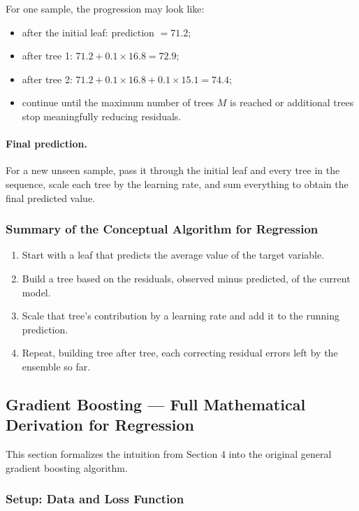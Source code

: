 \documentclass[12pt,openany]{book}
\begin{document}
For one sample, the progression may look like:
\begin{itemize}[leftmargin=*]
    \item after the initial leaf: prediction \(=71.2\);
    \item after tree 1: \(71.2+0.1\times16.8=72.9\);
    \item after tree 2: \(71.2+0.1\times16.8+0.1\times15.1=74.4\);
    \item continue until the maximum number of trees \(M\) is reached or additional trees stop meaningfully reducing residuals.
\end{itemize}

\paragraph{Final prediction.}
For a new unseen sample, pass it through the initial leaf and every tree in the sequence, scale each tree by the learning rate, and sum everything to obtain the final predicted value.

\subsubsection{Summary of the Conceptual Algorithm for Regression}

\begin{enumerate}[leftmargin=*]
    \item Start with a leaf that predicts the average value of the target variable.
    \item Build a tree based on the residuals, observed minus predicted, of the current model.
    \item Scale that tree's contribution by a learning rate and add it to the running prediction.
    \item Repeat, building tree after tree, each correcting residual errors left by the ensemble so far.
\end{enumerate}

\subsection{Gradient Boosting --- Full Mathematical Derivation for Regression}

This section formalizes the intuition from Section 4 into the original general gradient boosting algorithm.

\subsubsection{Setup: Data and Loss Function}
\end{document}

